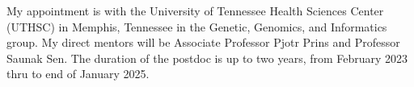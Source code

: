 My appointment is with the University of Tennessee Health Sciences Center (UTHSC) in Memphis, Tennessee in the Genetic, Genomics, and Informatics group.
My direct mentors will be Associate Professor Pjotr Prins and Professor Saunak Sen.
The duration of the postdoc is up to two years, from February 2023 thru to end of January 2025.
